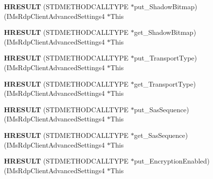 \begin{DoxyCompactItemize}
{\bfseries H\+R\+E\+S\+U\+LT} (S\+T\+D\+M\+E\+T\+H\+O\+D\+C\+A\+L\+L\+T\+Y\+PE $\ast$put\+\_\+\+Shadow\+Bitmap)(I\+Ms\+Rdp\+Client\+Advanced\+Settings4 $\ast$This
\item 
\mbox{\label{struct_i_ms_rdp_client_advanced_settings4_vtbl_a9c9869ae8e7bb0a9561b8753fcdb3960}} 
{\bfseries H\+R\+E\+S\+U\+LT} (S\+T\+D\+M\+E\+T\+H\+O\+D\+C\+A\+L\+L\+T\+Y\+PE $\ast$get\+\_\+\+Shadow\+Bitmap)(I\+Ms\+Rdp\+Client\+Advanced\+Settings4 $\ast$This
\item 
\mbox{\label{struct_i_ms_rdp_client_advanced_settings4_vtbl_ae4a02c7adadce2e058f9eb5fe74516f7}} 
{\bfseries H\+R\+E\+S\+U\+LT} (S\+T\+D\+M\+E\+T\+H\+O\+D\+C\+A\+L\+L\+T\+Y\+PE $\ast$put\+\_\+\+Transport\+Type)(I\+Ms\+Rdp\+Client\+Advanced\+Settings4 $\ast$This
\item 
\mbox{\label{struct_i_ms_rdp_client_advanced_settings4_vtbl_abbc07836eb7865f15da6be1e1f5a0d85}} 
{\bfseries H\+R\+E\+S\+U\+LT} (S\+T\+D\+M\+E\+T\+H\+O\+D\+C\+A\+L\+L\+T\+Y\+PE $\ast$get\+\_\+\+Transport\+Type)(I\+Ms\+Rdp\+Client\+Advanced\+Settings4 $\ast$This
\item 
\mbox{\label{struct_i_ms_rdp_client_advanced_settings4_vtbl_ad44a9a14d1a5599b07be2dd2f1a2f226}} 
{\bfseries H\+R\+E\+S\+U\+LT} (S\+T\+D\+M\+E\+T\+H\+O\+D\+C\+A\+L\+L\+T\+Y\+PE $\ast$put\+\_\+\+Sas\+Sequence)(I\+Ms\+Rdp\+Client\+Advanced\+Settings4 $\ast$This
\item 
\mbox{\label{struct_i_ms_rdp_client_advanced_settings4_vtbl_a9cb26fcbb9c113b0e450c67982925f0d}} 
{\bfseries H\+R\+E\+S\+U\+LT} (S\+T\+D\+M\+E\+T\+H\+O\+D\+C\+A\+L\+L\+T\+Y\+PE $\ast$get\+\_\+\+Sas\+Sequence)(I\+Ms\+Rdp\+Client\+Advanced\+Settings4 $\ast$This
\item 
\mbox{\label{struct_i_ms_rdp_client_advanced_settings4_vtbl_af31487353dcc4b42e3338231284c62eb}} 
{\bfseries H\+R\+E\+S\+U\+LT} (S\+T\+D\+M\+E\+T\+H\+O\+D\+C\+A\+L\+L\+T\+Y\+PE $\ast$put\+\_\+\+Encryption\+Enabled)(I\+Ms\+Rdp\+Client\+Advanced\+Settings4 $\ast$This
\item 

\end{DoxyCompactItemize}
